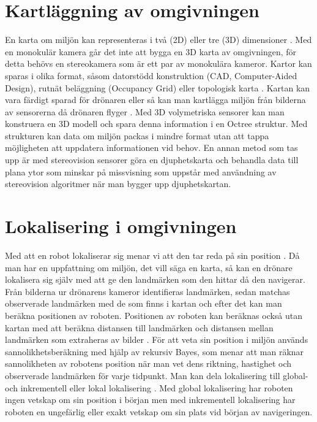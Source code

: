 \section{Kartläggning av omgivningen}

En karta om miljön kan representeras i två (2D) eller tre (3D) dimensioner \citep{geospatial}. Med en monokulär kamera går det inte att bygga en 3D karta av omgivningen, för detta behövs en stereokamera som är ett par av monokulära kameror. Kartor kan sparas i olika format, såsom datorstödd konstruktion (CAD, Computer-Aided Design), rutnät beläggning (Occupancy Grid) eller topologisk karta \citep{982903}. Kartan kan vara färdigt sparad för drönaren eller så kan man kartlägga miljön från bilderna av sensorerna då drönaren flyger \citep{geospatial}. Med 3D volymetriska sensorer kan man konstruera en 3D modell och spara denna information i en Octree struktur. Med strukturen kan data om miljön packas i mindre format utan att tappa möjligheten att uppdatera informationen vid behov. En annan metod som tas upp är med stereovision sensorer göra en djuphetskarta och behandla data till plana ytor som minskar på missvisning som uppstår med användning av stereovision algoritmer när man bygger upp djuphetskartan.

\section{Lokalisering i omgivningen}

Med att en robot lokaliserar sig menar vi att den tar reda på sin position \citep{982903}. Då man har en uppfattning om miljön, det vill säga en karta, så kan en drönare lokalisera sig själv med att ge den landmärken som den hittar då den navigerar. Från bilderna ur drönarens kameror identifieras landmärken, sedan matchas observerade landmärken med de som finns i kartan och efter det kan man beräkna positionen av roboten. Positionen av roboten kan beräknas också utan kartan med att beräkna distansen till landmärken och distansen mellan landmärken som extraheras av bilder \citep{realslamproblem}. För att veta sin position i miljön används sannolikhetsberäkning med hjälp av rekursiv Bayes, som menar att man räknar sannolikheten av robotens position när man vet dens riktning, hastighet och observerade landmärken för varje tidpunkt. Man kan dela lokalisering till global- och inkrementell eller lokal lokalisering \citep{982903, globalsubmaps}. Med global lokalisering har roboten ingen vetskap om sin position i början men med inkrementell lokalisering har roboten en ungefärlig eller exakt vetskap om sin plats vid början av navigeringen. 

